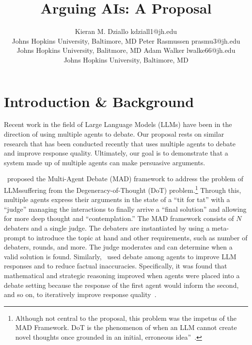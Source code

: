 \documentclass[jair,twoside,11pt,theapa]{article}
\begin{document}
\title{Arguing AIs: A Proposal}
\author{\name Kieran M. Dziallo \email kdziall1@jh.edu\\
                \addr Johns Hopkins University, Baltimore, MD
		\AND
		\name Peter Rasmussen \email prasmu3@jh.edu\\
				\addr Johns Hopkins University, Balitmore, MD
		\AND
		\name Adam Walker \email lwalke66@jh.edu\\
				\addr Johns Hopkins University, Baltimore, MD}
\maketitle


\section{Introduction \& Background}
Recent work in the field of Large Language Models (LLMs) have been in the direction of using multiple agents to debate.  Our proposal rests on similar research that has been conducted recently that uses multiple agents to debate and improve response quality.  Ultimately, our goal is to demonstrate that a system made up of multiple agents can make persuasive arguments.

~proposed the Multi-Agent Debate (MAD) framework to address the problem of LLMssuffering from the Degeneracy-of-Thought (DoT) problem.\footnote{Although not central to the proposal, this problem was the impetus of the MAD Framework.  DoT is the phenomenon of when an LLM cannot create novel thoughts once grounded in an initial, erroneous idea''~.}  Through this, multiple agents express their arguments in the state of a ``tit for tat'' with a ``judge'' managing the interactions to finally arrive a ``final solution'' and allowing for more deep thought and ``contemplation.''  The MAD framework consists of $N$ debaters and a single judge.  The debaters are instantiated by using a meta-prompt to introduce the topic at hand and other requirements, such as number of debaters, rounds, and more.  The judge moderates and can determine when a valid solution is found.  Similarly, ~used debate among agents to improve LLM responses and to reduce factual inaccuracies.  Specifically, it was found that mathematical and strategic reasoning improved when agents were placed into a debate setting because the response of the first agent would inform the second, and so on, to iteratively improve response quality~.
\end{document}
